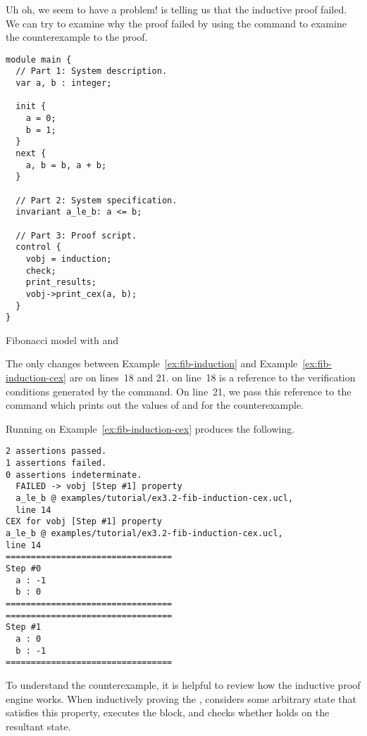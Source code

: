 Uh oh, we seem to have a problem! \uclid{} is telling us that the inductive proof failed. We can try to examine why the proof failed by using the  command to examine the counterexample to the proof.


\begin{uclidlisting}[htbp]
\begin{lstlisting}[language=uclid,style=uclidstyle]
module main {
  // Part 1: System description.
  var a, b : integer;

  init {
    a = 0;
    b = 1;
  }
  next {
    a, b = b, a + b;
  }

  // Part 2: System specification.
  invariant a_le_b: a <= b;

  // Part 3: Proof script.
  control {
    vobj = induction;
    check;
    print_results;
    vobj->print_cex(a, b);
  }
}
\end{lstlisting}
\caption{\uclid{} Fibonacci model with  and }
\label{ex:fib-induction-cex}
\end{uclidlisting}

The only changes between Example~\ref{ex:fib-induction} and Example~\ref{ex:fib-induction-cex} are on lines~18 and 21.  on line~18 is a reference to the verification conditions generated by the  command. On line~21, we pass this reference to the  command which prints out the values of  and  for the counterexample.

Running \uclid{} on Example~\ref{ex:fib-induction-cex} produces the following.

\begin{Verbatim}[frame=single, samepage=true]
2 assertions passed.
1 assertions failed.
0 assertions indeterminate.
  FAILED -> vobj [Step #1] property 
  a_le_b @ examples/tutorial/ex3.2-fib-induction-cex.ucl, 
  line 14
CEX for vobj [Step #1] property 
a_le_b @ examples/tutorial/ex3.2-fib-induction-cex.ucl, 
line 14
=================================
Step #0
  a : -1
  b : 0
=================================
=================================
Step #1
  a : 0
  b : -1
=================================
\end{Verbatim}

To understand the counterexample, it is helpful to review how the inductive proof engine works. When inductively proving the  , \uclid{} considers some arbitrary state that satisfies this property, executes the  block, and checks whether  holds on the resultant state.

